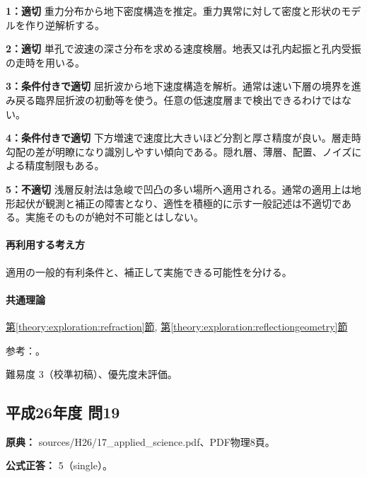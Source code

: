 \noindent\textbf{1：適切} 重力分布から地下密度構造を推定。重力異常に対して密度と形状のモデルを作り逆解析する。\par

\noindent\textbf{2：適切} 単孔で波速の深さ分布を求める速度検層。地表又は孔内起振と孔内受振の走時を用いる。\par

\noindent\textbf{3：条件付きで適切} 屈折波から地下速度構造を解析。通常は速い下層の境界を進み戻る臨界屈折波の初動等を使う。任意の低速度層まで検出できるわけではない。\par

\noindent\textbf{4：条件付きで適切} 下方増速で速度比大きいほど分割と厚さ精度が良い。層走時勾配の差が明瞭になり識別しやすい傾向である。隠れ層、薄層、配置、ノイズによる精度制限もある。\par

\noindent\textbf{5：不適切} 浅層反射法は急峻で凹凸の多い場所へ適用される。通常の適用上は地形起伏が観測と補正の障害となり、適性を積極的に示す一般記述は不適切である。実施そのものが絶対不可能とはしない。\par

\paragraph{再利用する考え方} 適用の一般的有利条件と、補正して実施できる可能性を分ける。

\paragraph{共通理論} \hyperref[theory:exploration:refraction]{第\ref*{theory:exploration:refraction}節}, \hyperref[theory:exploration:reflectiongeometry]{第\ref*{theory:exploration:reflectiongeometry}節}

\par 参考：\cite{epa_seismic_reflection,epa_seismic_refraction,usgs_static2004,geebec_ps}。

\par 難易度 3（校準初稿）、優先度未評価。

\subsection{平成26年度 問19}
\label{q:h26-reg-applied-19}

\noindent\textbf{原典：} sources/H26/17\_applied\_science.pdf、PDF物理8頁。

\textbf{公式正答：} 5（single）。

